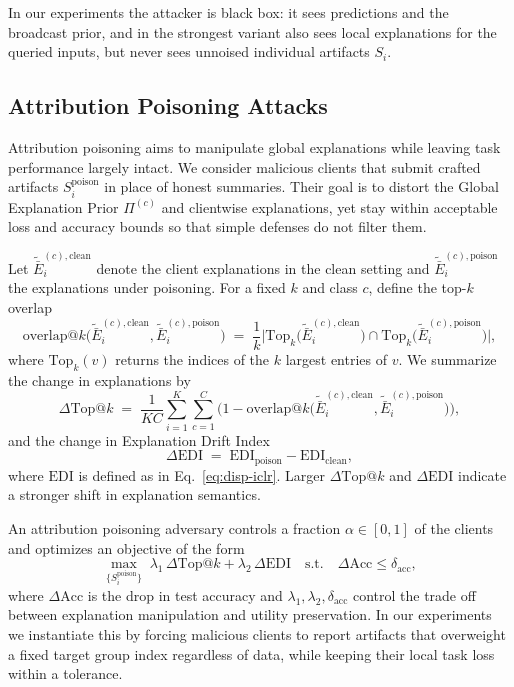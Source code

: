 \documentclass{article}
\theoremstyle{plain}
\theoremstyle{definition}
\theoremstyle{remark}
\begin{document}
In our experiments the attacker is black box: it sees predictions and the broadcast prior, and in the strongest variant also sees local explanations for the queried inputs, but never sees unnoised individual artifacts $S_i$.

\subsection{Attribution Poisoning Attacks}
\label{sec:threat-poison}

Attribution poisoning aims to manipulate global explanations while leaving task performance largely intact. We consider malicious clients that submit crafted artifacts $S_i^{\text{poison}}$ in place of honest summaries. Their goal is to distort the Global Explanation Prior $\Pi^{(c)}$ and clientwise explanations, yet stay within acceptable loss and accuracy bounds so that simple defenses do not filter them.

Let $\tilde{\bar{E}}^{(c),\text{clean}}_i$ denote the client explanations in the clean setting and $\tilde{\bar{E}}^{(c),\text{poison}}_i$ the explanations under poisoning. For a fixed $k$ and class $c$, define the top-$k$ overlap
\begin{equation}
\label{eq:topk-overlap}
\mathrm{overlap}@k\big(\tilde{\bar{E}}^{(c),\text{clean}}_i,\tilde{\bar{E}}^{(c),\text{poison}}_i\big)
\;=\;
\frac{1}{k}\big|\mathrm{Top}_k\big(\tilde{\bar{E}}^{(c),\text{clean}}_i\big)
\cap \mathrm{Top}_k\big(\tilde{\bar{E}}^{(c),\text{poison}}_i\big)\big|,
\end{equation}
where $\mathrm{Top}_k(v)$ returns the indices of the $k$ largest entries of $v$. We summarize the change in explanations by
\begin{equation}
\label{eq:delta-topk}
\Delta\text{Top}@k
\;=\;
\frac{1}{KC}\sum_{i=1}^K \sum_{c=1}^{C}
\Big(1 - \mathrm{overlap}@k\big(\tilde{\bar{E}}^{(c),\text{clean}}_i,
\tilde{\bar{E}}^{(c),\text{poison}}_i\big)\Big),
\end{equation}
and the change in Explanation Drift Index
\begin{equation}
\label{eq:delta-edi-appendix}
\Delta\mathrm{EDI}
\;=\;
\mathrm{EDI}_{\text{poison}} - \mathrm{EDI}_{\text{clean}},
\end{equation}
where $\mathrm{EDI}$ is defined as in Eq.~\eqref{eq:disp-iclr}. Larger $\Delta\text{Top}@k$ and $\Delta\mathrm{EDI}$ indicate a stronger shift in explanation semantics.

An attribution poisoning adversary controls a fraction $\alpha \in [0,1]$ of the clients and optimizes an objective of the form
\begin{equation}
\label{eq:poison-objective}
\max_{\{S_i^{\text{poison}}\}} \;
\lambda_1\,\Delta\text{Top}@k
+\lambda_2\,\Delta\mathrm{EDI}
\quad
\text{s.t.}\quad
\Delta\mathrm{Acc} \le \delta_{\text{acc}},
\end{equation}
where $\Delta\mathrm{Acc}$ is the drop in test accuracy and $\lambda_1,\lambda_2,\delta_{\text{acc}}$ control the trade off between explanation manipulation and utility preservation. In our experiments we instantiate this by forcing malicious clients to report artifacts that overweight a fixed target group index regardless of data, while keeping their local task loss within a tolerance.
\end{document}
